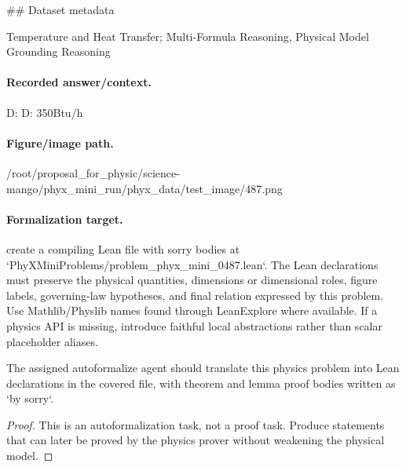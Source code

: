 \#\# Dataset metadata

Temperature and Heat Transfer; Multi-Formula Reasoning, Physical Model Grounding Reasoning

\paragraph{Recorded answer/context.}
D: D: 350Btu/h

\paragraph{Figure/image path.}
/root/proposal\_for\_physic/science-mango/phyx\_mini\_run/phyx\_data/test\_image/487.png

\paragraph{Formalization target.}
create a compiling Lean file with sorry bodies at `PhyXMiniProblems/problem\_phyx\_mini\_0487.lean`. The Lean declarations must preserve the physical quantities, dimensions or dimensional roles, figure labels, governing-law hypotheses, and final relation expressed by this problem.
Use Mathlib/Physlib names found through LeanExplore where available. If a physics API is missing, introduce faithful local abstractions rather than scalar placeholder aliases.

\begin{theorem}
\label{thm:physics:phyx_mini_0487:target}
The assigned autoformalize agent should translate this physics problem into Lean declarations in the covered file, with theorem and lemma proof bodies written as `by sorry`.
\end{theorem}
\begin{proof}
This is an autoformalization task, not a proof task. Produce statements that can later be proved by the physics prover without weakening the physical model.
\end{proof}

